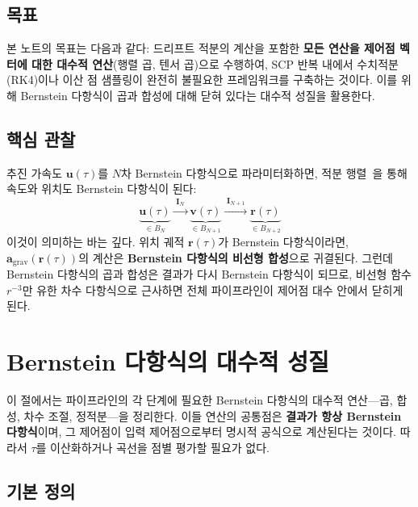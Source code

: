 \documentclass[11pt]{article}
\begin{document}
\subsection{목표}

본 노트의 목표는 다음과 같다: 드리프트 적분의 계산을 포함한
\textbf{모든 연산을 제어점 벡터에 대한 대수적 연산}(행렬 곱, 텐서 곱)으로 수행하여,
SCP 반복 내에서 수치적분(RK4)이나 이산 점 샘플링이 완전히 불필요한
프레임워크를 구축하는 것이다.
이를 위해 Bernstein 다항식이 곱과 합성에 대해 닫혀 있다는 대수적 성질을 활용한다.

\subsection{핵심 관찰}

추진 가속도 $\mathbf{u}(\tau)$를 $N$차 Bernstein 다항식으로 파라미터화하면,
적분 행렬~\cite{report004}을 통해 속도와 위치도 Bernstein 다항식이 된다:
\begin{equation}
  \underbrace{\mathbf{u}(\tau)}_{\in B_N}
  \xrightarrow{\;\mathbf{I}_N\;}
  \underbrace{\mathbf{v}(\tau)}_{\in B_{N+1}}
  \xrightarrow{\;\mathbf{I}_{N+1}\;}
  \underbrace{\mathbf{r}(\tau)}_{\in B_{N+2}}
  \label{eq:integration-chain}
\end{equation}
이것이 의미하는 바는 깊다.
위치 궤적 $\mathbf{r}(\tau)$가 Bernstein 다항식이라면,
$\mathbf{a}_\mathrm{grav}(\mathbf{r}(\tau))$의 계산은
\textbf{Bernstein 다항식의 비선형 합성}으로 귀결된다.
그런데 Bernstein 다항식의 곱과 합성은 결과가 다시 Bernstein 다항식이 되므로,
비선형 함수 $r^{-3}$만 유한 차수 다항식으로 근사하면
전체 파이프라인이 제어점 대수 안에서 닫히게 된다.

\section{Bernstein 다항식의 대수적 성질}
\label{sec:algebra}

이 절에서는 파이프라인의 각 단계에 필요한 Bernstein 다항식의 대수적 연산---곱,
합성, 차수 조절, 정적분---을 정리한다.
이들 연산의 공통점은 \textbf{결과가 항상 Bernstein 다항식}이며,
그 제어점이 입력 제어점으로부터 명시적 공식으로 계산된다는 것이다.
따라서 $\tau$를 이산화하거나 곡선을 점별 평가할 필요가 없다.

\subsection{기본 정의}
\end{document}
